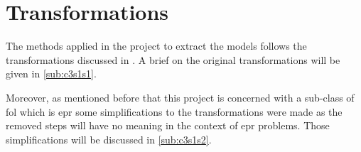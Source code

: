 \section{Transformations}\label{sec:c3s1}
The methods applied in the project to extract the models follows the transformations discussed in \cite{BMUG06}. A brief on the original transformations will be given in \ref{sub:c3s1s1}.


Moreover, as mentioned before that this project is concerned with a sub-class of \ac{fol} which is \ac{epr} some simplifications to the transformations were made as the removed steps will have no meaning in the context of \ac{epr} problems. Those simplifications will be discussed in \ref{sub:c3s1s2}.

	
	
	